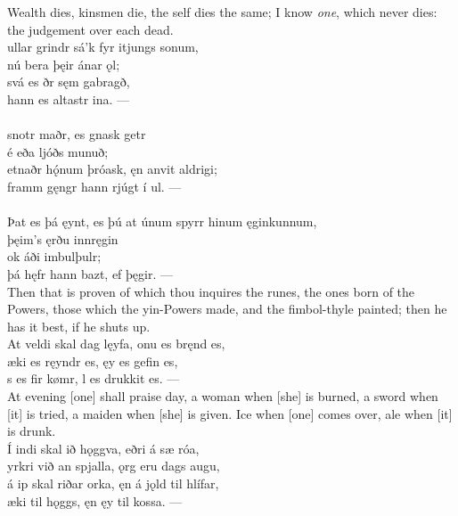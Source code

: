 \bvb Wealth dies, kinsmen die, the self dies the same; I know \emph{one}, which never dies: the judgement over each dead. \\

\bva {}ullar grindr \hld sá'k fyr itjungs sonum, \\%
\ind nú bera þęir ánar ǫl; \\%
svá es ðr \hld sęm gabragð, \\%
\ind hann es altastr ina. —\\%

 \\

\bva {}snotr maðr, \hld es gnask getr \\%
\ind {}é eða ljóðs munuð; \\%
etnaðr hǫ́num þróask, \hld ęn anvit aldrigi; \\%
\ind framm gęngr hann rjúgt í ul. —\\%

 \\

\bva Þat es þá ęynt, \hld es þú at únum spyrr \hld hinum ęginkunnum, \\%
\ind þęim's ęrðu innręgin \\%
\ind ok áði imbulþulr; \\%
\ind þá hęfr hann bazt, ef þęgir. —\\%

\bvb Then that is proven of which thou inquires the runes, the ones born of the Powers, those which the yin-Powers made, and the fimbol-thyle painted; then he has it best, if he shuts up. \\

\bva At veldi skal dag lęyfa, \hld {}onu es bręnd es, \\%
æki es ręyndr es, \hld {}ęy es gefin es, \\%
s es fir kømr, \hld {}l es drukkit es. —\\%

\bvb At evening [one] shall praise day, a woman when [she] is burned, a sword when [it] is tried, a maiden when [she] is given. Ice when [one] comes over, ale when [it] is drunk. \\

\bva Í indi skal ið hǫggva, \hld {}eðri á sæ róa, \\%
yrkri við an spjalla, \hld {}ǫrg eru dags augu, \\%
á ip skal riðar orka, \hld ęn á jǫld til hlífar, \\%
æki til hǫggs, \hld ęn ęy til kossa. —\\%

